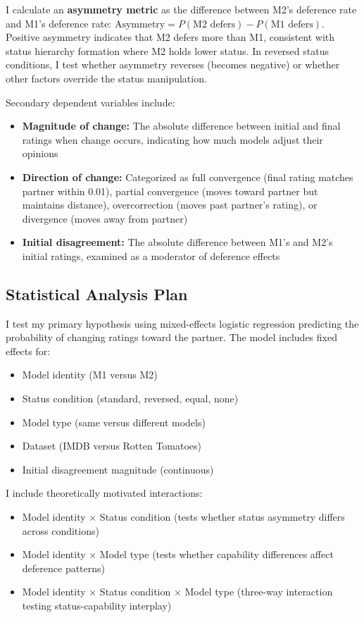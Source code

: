 I calculate an \textbf{asymmetry metric} as the difference between M2's deference rate and M1's deference rate: $\text{Asymmetry} = P(\text{M2 defers}) - P(\text{M1 defers})$. Positive asymmetry indicates that M2 defers more than M1, consistent with status hierarchy formation where M2 holds lower status. In reversed status conditions, I test whether asymmetry reverses (becomes negative) or whether other factors override the status manipulation.

Secondary dependent variables include:

\begin{itemize}
\item \textbf{Magnitude of change:} The absolute difference between initial and final ratings when change occurs, indicating how much models adjust their opinions
\item \textbf{Direction of change:} Categorized as full convergence (final rating matches partner within 0.01), partial convergence (moves toward partner but maintains distance), overcorrection (moves past partner's rating), or divergence (moves away from partner)
\item \textbf{Initial disagreement:} The absolute difference between M1's and M2's initial ratings, examined as a moderator of deference effects
\end{itemize}

\subsection*{Statistical Analysis Plan}

I test my primary hypothesis using mixed-effects logistic regression predicting the probability of changing ratings toward the partner. The model includes fixed effects for:
\begin{itemize}
\item Model identity (M1 versus M2)
\item Status condition (standard, reversed, equal, none)  
\item Model type (same versus different models)
\item Dataset (IMDB versus Rotten Tomatoes)
\item Initial disagreement magnitude (continuous)
\end{itemize}

I include theoretically motivated interactions:
\begin{itemize}
\item Model identity × Status condition (tests whether status asymmetry differs across conditions)
\item Model identity × Model type (tests whether capability differences affect deference patterns)
\item Model identity × Status condition × Model type (three-way interaction testing status-capability interplay)
\end{itemize}


